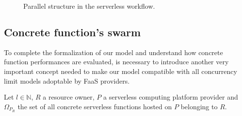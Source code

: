 \documentclass[12pt,a4paper]{report}
\newcommand{\N}{\mathbb{N}}
\begin{document}
\begin{figure}[h!]
	\caption{Parallel structure in the serverless workflow.}
\end{figure}

\subsection{Concrete function's swarm}

To complete the formalization of our model and understand how concrete function performances are evaluated, is necessary to introduce another very important concept needed to make our model compatible with all concurrency limit models adoptable by FaaS providers.

Let $l \in \N$, $R$ a resource owner, $P$ a serverless computing platform provider and $\Omega_{P_R}$ the set of all concrete serverless functions hosted on $P$ belonging to $R$.
\end{document}
